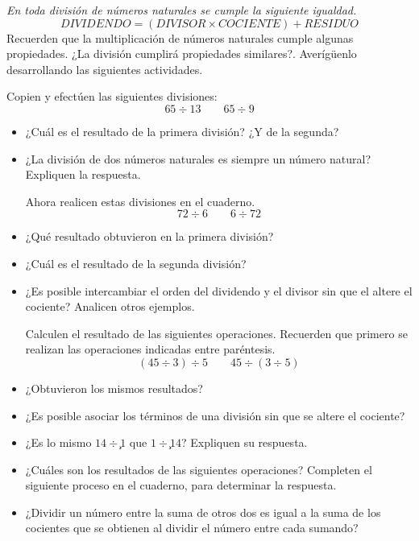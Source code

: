 \documentclass[letterpaper,11pt,twoside]{article}
\begin{document}
\begin{multicols}{2}
\emph{En toda división de números naturales se cumple
la siguiente igualdad.}
\[DIVIDENDO=(DIVISOR\times COCIENTE)+RESIDUO\]
Recuerden que la multiplicación de números naturales
cumple algunas propiedades. ¿La división cumplirá propiedades similares?. Averígüenlo desarrollando las siguientes actividades.

Copien y efectúen las siguientes divisiones:
\[65\div 13 \qquad 65\div 9\]
\begin{itemize}
\item ¿Cuál es el resultado de la primera división? ¿Y de la segunda?
\item ¿La división de dos números naturales es siempre un número natural? Expliquen la respuesta.

Ahora realicen estas divisiones en el cuaderno.
\[72\div 6 \qquad 6\div 72\]
\item ¿Qué resultado obtuvieron en la primera división?
\item ¿Cuál es el resultado de la segunda división?
\item ¿Es posible intercambiar el orden del dividendo y el divisor sin que el altere el cociente? Analicen otros ejemplos.

Calculen el resultado de las siguientes operaciones. Recuerden que primero se realizan las operaciones indicadas entre paréntesis.
\[(45\div 3)\div 5\qquad 45\div (3\div 5) \]
\item ¿Obtuvieron los mismos resultados?
\item ¿Es posible asociar los términos de una división sin que se altere el cociente?
\item ¿Es lo mismo $14 \div ̧1$ que $1 \div ̧14$? Expliquen su respuesta.
\item ¿Cuáles son los resultados de las siguientes
operaciones? Completen el siguiente proceso en el
cuaderno, para determinar la respuesta.
\item ¿Dividir un número entre la suma de otros dos es igual a la suma de los cocientes que se obtienen al dividir el número entre cada sumando?

\end{itemize}
\end{multicols}
\end{document}
